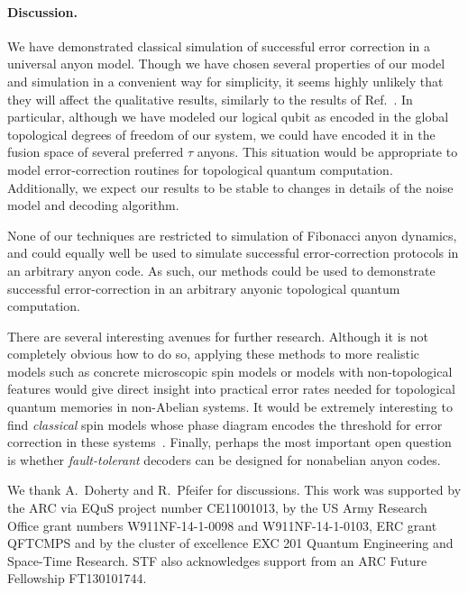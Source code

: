 \documentclass[aps, prl, letterpaper, twocolumn, superscriptaddress, notitlepage, 10pt]{revtex4-1}
\begin{document}
\paragraph{Discussion.}

We have demonstrated classical simulation of successful error correction in a universal anyon model. 
Though we have chosen several properties of our model and simulation in a convenient way for simplicity, it seems highly unlikely that they will affect the qualitative results, similarly to the results of Ref.~\cite{Brell2013}. 
In particular, although we have modeled our logical qubit as encoded in the global topological degrees of freedom of our system, we could have encoded it in the fusion space of several preferred $\tau$ anyons. 
This situation would be appropriate to model error-correction routines for topological quantum computation. 
Additionally, we expect our results to be stable to changes in details of the noise model and decoding algorithm.

None of our techniques are restricted to simulation of Fibonacci anyon dynamics, and could 
equally well be used to simulate successful error-correction protocols in an arbitrary anyon 
code. 
As such, our methods could be used to demonstrate successful error-correction in an arbitrary anyonic topological quantum computation.

There are several interesting avenues for further research. 
Although it is not completely obvious how to do so, applying these methods to more realistic models such as concrete microscopic spin models or models with non-topological features would give direct insight into practical error rates needed for topological quantum memories in non-Abelian systems. 
It would be extremely interesting to find \emph{classical} spin models whose phase diagram encodes the threshold for error correction in these systems~\cite{Dennis2002}.
Finally, perhaps the most important open question is whether 
\emph{fault-tolerant} decoders can be designed for nonabelian anyon codes. 


\acknowledgments 

We thank A.\ Doherty and R.\ Pfeifer for discussions. 
This work was supported by the ARC via EQuS project number CE11001013, by the US Army Research Office grant numbers W911NF-14-1-0098 and W911NF-14-1-0103, ERC grant QFTCMPS and by the cluster of excellence EXC 201 Quantum Engineering and Space-Time Research. STF also acknowledges support from an ARC Future Fellowship FT130101744.


\end{document}
